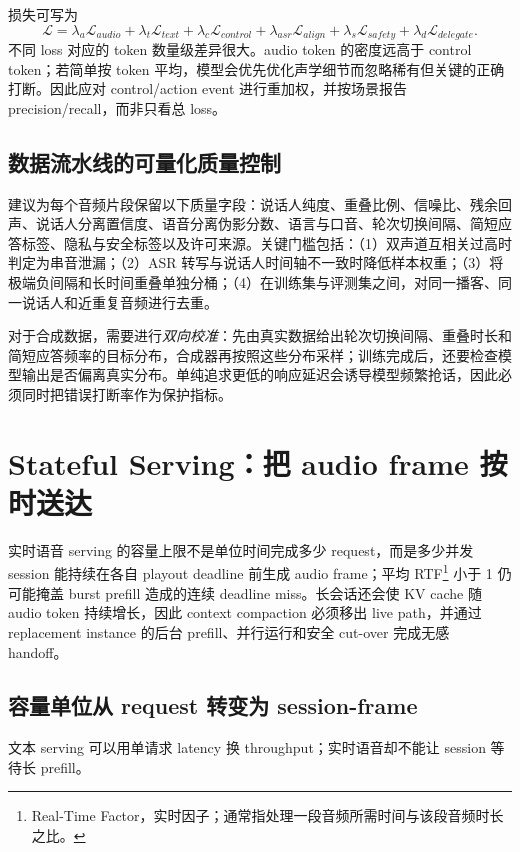 损失可写为
\begin{equation}
\mathcal L=\lambda_a\mathcal L_{audio}+\lambda_t\mathcal L_{text}+\lambda_c\mathcal L_{control}
+\lambda_{asr}\mathcal L_{align}+\lambda_s\mathcal L_{safety}+\lambda_d\mathcal L_{delegate}.
\end{equation}
不同 loss 对应的 token 数量级差异很大。audio token 的密度远高于 control token；若简单按 token 平均，模型会优先优化声学细节而忽略稀有但关键的正确打断。因此应对 control/action event 进行重加权，并按场景报告 precision/recall，而非只看总 loss。

\subsection{数据流水线的可量化质量控制}

建议为每个音频片段保留以下质量字段：说话人纯度、重叠比例、信噪比、残余回声、说话人分离置信度、语音分离伪影分数、语言与口音、轮次切换间隔、简短应答标签、隐私与安全标签以及许可来源。关键门槛包括：（1）双声道互相关过高时判定为串音泄漏；（2）ASR 转写与说话人时间轴不一致时降低样本权重；（3）将极端负间隔和长时间重叠单独分桶；（4）在训练集与评测集之间，对同一播客、同一说话人和近重复音频进行去重。

对于合成数据，需要进行\emph{双向校准}：先由真实数据给出轮次切换间隔、重叠时长和简短应答频率的目标分布，合成器再按照这些分布采样；训练完成后，还要检查模型输出是否偏离真实分布。单纯追求更低的响应延迟会诱导模型频繁抢话，因此必须同时把错误打断率作为保护指标。

\section{Stateful Serving：把 audio frame 按时送达}

实时语音 serving 的容量上限不是单位时间完成多少 request，而是多少并发 session 能持续在各自 playout deadline 前生成 audio frame；平均 RTF\footnote{Real-Time Factor，实时因子；通常指处理一段音频所需时间与该段音频时长之比。} 小于 1 仍可能掩盖 burst prefill 造成的连续 deadline miss。长会话还会使 KV cache 随 audio token 持续增长，因此 context compaction 必须移出 live path，并通过 replacement instance 的后台 prefill、并行运行和安全 cut-over 完成无感 handoff。

\subsection{容量单位从 request 转变为 session-frame}

文本 serving 可以用单请求 latency 换 throughput；实时语音却不能让 session 等待长 prefill。

